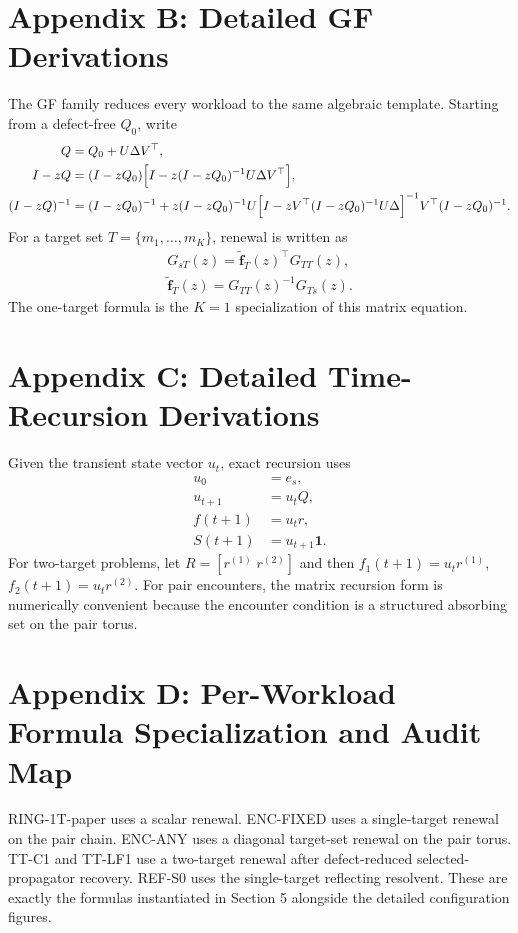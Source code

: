 \documentclass[11pt]{article}
\newcommand{\TabDir}{../artifacts/tables}
\begin{document}
\section{Appendix B: Detailed GF Derivations}
The GF family reduces every workload to the same algebraic template. Starting from a defect-free $Q_0$, write
\begin{align}
Q &= Q_0 + U\Delta V^{\top},\\
I-zQ &= (I-zQ_0)\Bigl[I-z(I-zQ_0)^{-1}U\Delta V^{\top}\Bigr],\\
(I-zQ)^{-1} &= (I-zQ_0)^{-1} + z(I-zQ_0)^{-1}U\Bigl[I-zV^{\top}(I-zQ_0)^{-1}U\Delta\Bigr]^{-1}V^{\top}(I-zQ_0)^{-1}.
\end{align}
For a target set $T=\{m_1,\dots,m_K\}$, renewal is written as
\begin{align}
G_{sT}(z)=\widetilde{\mathbf f}_T(z)^{\top}G_{TT}(z),\\
\widetilde{\mathbf f}_T(z)=G_{TT}(z)^{-1}G_{Ts}(z).
\end{align}
The one-target formula is the $K=1$ specialization of this matrix equation.
\section{Appendix C: Detailed Time-Recursion Derivations}
Given the transient state vector $u_t$, exact recursion uses
\begin{align}
u_0 &= e_s,\\
u_{t+1} &= u_tQ,\\
f(t+1) &= u_tr,\\
S(t+1) &= u_{t+1}\mathbf 1. 
\end{align}
For two-target problems, let $R=[r^{(1)}\;r^{(2)}]$ and then $f_1(t+1)=u_tr^{(1)}$, $f_2(t+1)=u_tr^{(2)}$. 
For pair encounters, the matrix recursion form is numerically convenient because the encounter condition is a structured absorbing set on the pair torus.
\section{Appendix D: Per-Workload Formula Specialization and Audit Map}
RING-1T-paper uses a scalar renewal. ENC-FIXED uses a single-target renewal on the pair chain. ENC-ANY uses a diagonal target-set renewal on the pair torus. 
TT-C1 and TT-LF1 use a two-target renewal after defect-reduced selected-propagator recovery. REF-S0 uses the single-target reflecting resolvent. 
These are exactly the formulas instantiated in Section 5 alongside the detailed configuration figures.
\begin{table}[H]
\centering\small
\resizebox{\linewidth}{!}{%

}
\caption{Audit appendix: actual solver pair, mathematical object, paper provenance, and implementation anchor for each workload.}
\end{table}
\end{document}
